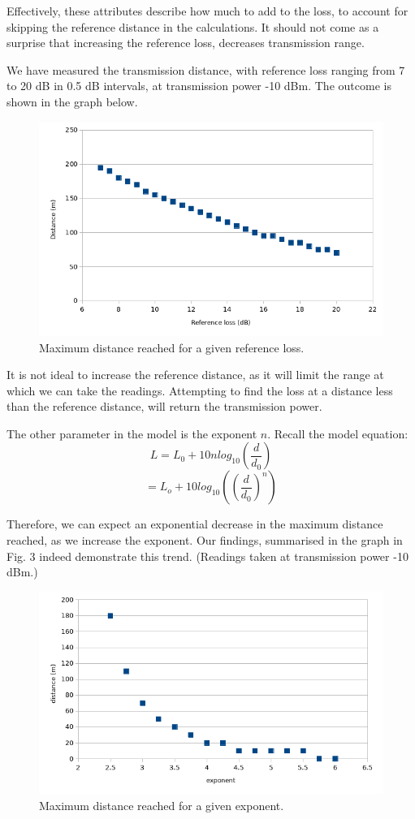 \documentclass[11pt,journal]{article}
\begin{document}
	Effectively, these attributes describe how much to add to the loss, to account for skipping the reference distance in the calculations. It should not come as a surprise that increasing the reference loss, decreases transmission range. 
	
	We have measured the transmission distance, with reference loss ranging from 7 to 20 dB in 0.5 dB intervals, at transmission power -10 dBm. The outcome is shown in the graph below.
	
	\begin{figure}[h]
		\centering
		\includegraphics[scale=0.6]{graph_log_refloss.png}
		\caption{Maximum distance reached for a given reference loss.}
	\end{figure}
	
	It is not ideal to increase the reference distance, as it will limit the range at which we can take the readings. Attempting to find the loss at a distance less than the reference distance, will return the transmission power.

	The other parameter in the model is the exponent $n$. Recall the model equation:
		\[L = L_0 + 10nlog_{10}(\dfrac{d}{d_0})\] 
		\[ = L_o + 10log_{10}((\dfrac{d}{d_0})^n)\]
		
	Therefore, we can expect an exponential decrease in the maximum distance reached, as we increase the exponent. Our findings, summarised in the graph in Fig. 3 indeed demonstrate this trend. (Readings taken at transmission power -10 dBm.)
	
	
	\begin{figure}[h]
		\centering
		\includegraphics[scale=0.6]{graph_log_exponent.png}
		\caption{Maximum distance reached for a given exponent.}
	\end{figure}
	
\end{document}
